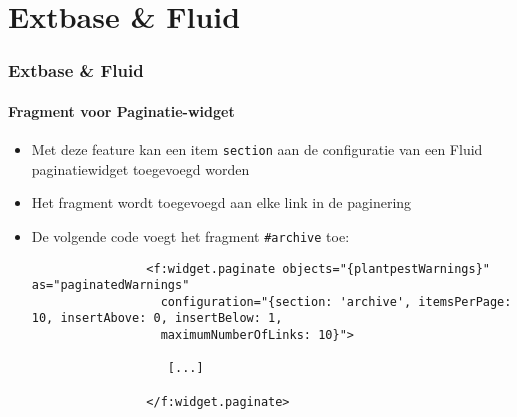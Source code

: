 %

\section{Extbase \& Fluid}


\begin{frame}[fragile]
	\frametitle{Extbase \& Fluid}
	\framesubtitle{Fragment voor Paginatie-widget}

	\lstset{basicstyle=\tiny\ttfamily}

	\begin{itemize}

		\item Met deze feature kan een item \texttt{section} aan de configuratie van een Fluid paginatiewidget toegevoegd worden

		\item Het fragment wordt toegevoegd aan elke link in de paginering

		\item De volgende code voegt het fragment \texttt{\#archive} toe:

			\begin{lstlisting}
				<f:widget.paginate objects="{plantpestWarnings}" as="paginatedWarnings"
				  configuration="{section: 'archive', itemsPerPage: 10, insertAbove: 0, insertBelow: 1,
				  maximumNumberOfLinks: 10}">

				   [...]

				</f:widget.paginate>
			\end{lstlisting}

	\end{itemize}

\end{frame}

